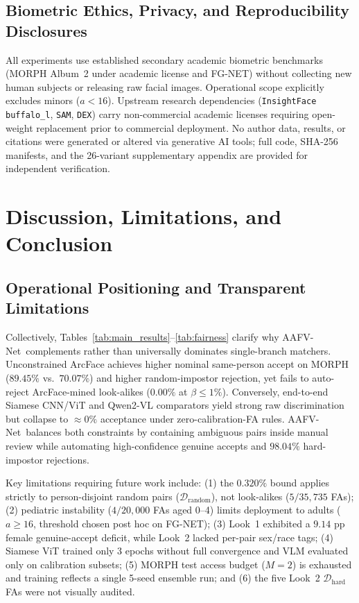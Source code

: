 \documentclass[journal]{IEEEtran}
\newcommand{\sys}{AAFV-Net}
\begin{document}


\subsection{Biometric Ethics, Privacy, and Reproducibility Disclosures}
All experiments use established secondary academic biometric benchmarks (MORPH Album~2 under academic license and FG-NET) without collecting new human subjects or releasing raw facial images. Operational scope explicitly excludes minors ($a < 16$). Upstream research dependencies (\texttt{InsightFace buffalo\_l}, \texttt{SAM}, \texttt{DEX}) carry non-commercial academic licenses requiring open-weight replacement prior to commercial deployment. No author data, results, or citations were generated or altered via generative AI tools; full code, SHA-256 manifests, and the 26-variant supplementary appendix are provided for independent verification.

\section{Discussion, Limitations, and Conclusion}
\label{sec:conclusion}

\subsection{Operational Positioning and Transparent Limitations}
\label{sec:limitations}
Collectively, Tables~\ref{tab:main_results}--\ref{tab:fairness} clarify why \sys\ complements rather than universally dominates single-branch matchers. Unconstrained ArcFace achieves higher nominal same-person accept on MORPH ($89.45\%$ vs.\ $70.07\%$) and higher random-impostor rejection, yet fails to auto-reject ArcFace-mined look-alikes ($0.00\%$ at $\beta \le 1\%$). Conversely, end-to-end Siamese CNN/ViT and Qwen2-VL comparators yield strong raw discrimination but collapse to $\approx 0\%$ acceptance under zero-calibration-FA rules. \sys\ balances both constraints by containing ambiguous pairs inside manual review while automating high-confidence genuine accepts and $98.04\%$ hard-impostor rejections.

Key limitations requiring future work include: (1) the $0.320\%$ bound applies strictly to person-disjoint random pairs ($\mathcal{D}_{\text{random}}$), not look-alikes ($5/35{,}735$ FAs); (2) pediatric instability ($4/20{,}000$ FAs aged 0--4) limits deployment to adults ($a \ge 16$, threshold chosen post hoc on FG-NET); (3) Look~1 exhibited a $9.14$ pp female genuine-accept deficit, while Look~2 lacked per-pair sex/race tags; (4) Siamese ViT trained only 3 epochs without full convergence and VLM evaluated only on calibration subsets; (5) MORPH test access budget ($M=2$) is exhausted and training reflects a single 5-seed ensemble run; and (6) the five Look~2 $\mathcal{D}_{\text{hard}}$ FAs were not visually audited.
\end{document}
